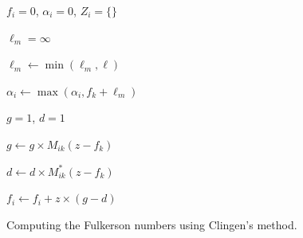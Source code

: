 \documentclass[12pt]{article}
\def\P{\mathbb{P}}
\begin{document}
\begin{algorithm}	
	
	{	
		$f_i = 0$, $\alpha_i = 0$, $Z_i = \{\}$
		
		{
			$\ell_m = \infty$
			
			{
				$\ell_m \leftarrow \min(\ell_m, \ell)$
				
			}
			
			$\alpha_i \leftarrow \max(\alpha_i, f_k + \ell_m)$
		}
		
		
		{
			{
				$g = 1$, $d = 1$
				
				{
					$g \leftarrow g \times M_{ik}(z - f_k)$
					
					$d \leftarrow d \times M_{ik}^{*}(z - f_k)$
				}
				
				$f_i \leftarrow f_i + z \times (g - d)$				
			}
		}		
	}	
	\caption{Computing the Fulkerson numbers using Clingen's method.}
	\label{alg.fulkerson}
\end{algorithm} 


\end{document}
